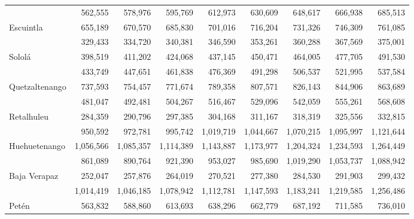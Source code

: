 {\begin{center}
\begin{tabular}{lrrrrrrrr}
			\rowcolor{color1!10!white} \multicolumn{1}{l}{Chimaltenango}	&	 562,555 	&	 578,976 	&	 595,769 	&	 612,973 	&	 630,609 	&	 648,617 	&	 666,938 	&	 685,513 	\\
			\multicolumn{1}{l}{Escuintla}	&	 655,189 	&	 670,570 	&	 685,830 	&	 701,016 	&	 716,204 	&	 731,326 	&	 746,309 	&	 761,085 	\\
			\rowcolor{color1!10!white} \multicolumn{1}{l}{Santa Rosa}	&	 329,433 	&	 334,720 	&	 340,381 	&	 346,590 	&	 353,261 	&	 360,288 	&	 367,569 	&	 375,001 	\\
			\multicolumn{1}{l}{Sololá}	&	 398,519 	&	 411,202 	&	 424,068 	&	 437,145 	&	 450,471 	&	 464,005 	&	 477,705 	&	 491,530 	\\
			\rowcolor{color1!10!white} \multicolumn{1}{l}{Totonicapán}	&	 433,749 	&	 447,651 	&	 461,838 	&	 476,369 	&	 491,298 	&	 506,537 	&	 521,995 	&	 537,584 	\\
			\multicolumn{1}{l}{Quetzaltenango}	&	 737,593 	&	 754,457 	&	 771,674 	&	 789,358 	&	 807,571 	&	 826,143 	&	 844,906 	&	 863,689 	\\
		\rowcolor{color1!10!white} \multicolumn{1}{l}{Suchitepéquez}	&	 481,047 	&	 492,481 	&	 504,267 	&	 516,467 	&	 529,096 	&	 542,059 	&	 555,261 	&	 568,608 	\\
			\multicolumn{1}{l}{Retalhuleu}	&	 284,359 	&	 290,796 	&	 297,385 	&	 304,168 	&	 311,167 	&	 318,319 	&	 325,556 	&	 332,815 	\\
			\rowcolor{color1!10!white} \multicolumn{1}{l}{San Marcos}	&	 950,592 	&	 972,781 	&	 995,742 	&	 1,019,719 	&	 1,044,667 	&	 1,070,215 	&	 1,095,997 	&	 1,121,644 	\\
			\multicolumn{1}{l}{Huehuetenango}	&	 1,056,566 	&	 1,085,357 	&	 1,114,389 	&	 1,143,887 	&	 1,173,977 	&	 1,204,324 	&	 1,234,593 	&	 1,264,449 	\\
			\rowcolor{color1!10!white} \multicolumn{1}{l}{Quiché}	&	 861,089 	&	 890,764 	&	 921,390 	&	 953,027 	&	 985,690 	&	 1,019,290 	&	 1,053,737 	&	 1,088,942 	\\
			\multicolumn{1}{l}{Baja Verapaz}	&	 252,047 	&	 257,876 	&	 264,019 	&	 270,521 	&	 277,380 	&	 284,530 	&	 291,903 	&	 299,432 	\\
			\rowcolor{color1!10!white} \multicolumn{1}{l}{Alta Verapaz}	&	 1,014,419 	&	 1,046,185 	&	 1,078,942 	&	 1,112,781 	&	 1,147,593 	&	 1,183,241 	&	 1,219,585 	&	 1,256,486 	\\
			\multicolumn{1}{l}{Petén}	&	 563,832 	&	 588,860 	&	 613,693 	&	 638,296 	&	 662,779 	&	 687,192 	&	 711,585 	&	 736,010 	\\

\end{tabular}
\end{center}}
